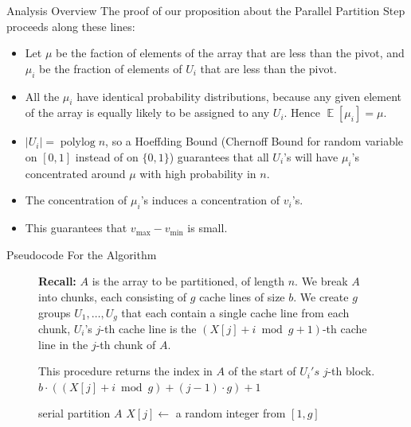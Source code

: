 \documentclass[table,serif,mathserif,final]{beamer}
\def\E{\operatorname{\mathbb{E}}}
\newcommand{\polylog}{\operatorname{polylog}}
\theoremstyle{remark}
\begin{document}
\begin{frame}{}
\begin{columns}[t]
\begin{column}{0.21\linewidth}
\begin{block}{\Huge Analysis Overview}
  \justifying
  \Huge
  The proof of our proposition about the Parallel Partition Step proceeds along these lines:
  \begin{itemize}
    \item Let $\mu$ be the faction of elements of the array that are less than the pivot, and $\mu_i$ be the fraction of elements of $U_i$ that are less than the pivot.
    \item All the $\mu_i$ have identical probability distributions, because any given element of the array is equally likely to be assigned to any $U_i$. Hence $\E[\mu_i] = \mu$.
    \item $|U_i| = \polylog n$, so a Hoeffding Bound (Chernoff Bound for random variable on $[0,1]$ instead of on $\{0,1\}$) guarantees that all $U_i$'s
      will have $\mu_i$'s concentrated around $\mu$ with high probability in $n$.
    \item The concentration of $\mu_i$'s induces a concentration of $v_i$'s. 
    \item This guarantees that $v_{\max} - v_{\min}$ is small. 
  \end{itemize}
\end{block}
\vspace{1cm}

\begin{block}{\Huge Pseudocode For the Algorithm}
  \justifying
  \large

\begin{figure}
  \label{alg:parallelPartition_smoothedStriding}
  \begin{algorithmic}%
    \State \textbf{Recall:} 
    \State $A$ is the array to be partitioned, of length $n$. 
    \State We break $A$ into chunks, each consisting of $g$ cache lines of size $b$.
    \State We create $g$ groups $U_1,\ldots, U_g$ that each contain a single cache line from each chunk,
    \State $U_i$'s $j$-th cache line is the $(X[j]+i \bmod g + 1)$-th cache line in the $j$-th chunk of $A$.
    \State

      \Comment This procedure returns the index in $A$ of the start of $U_i's$ $j$-th block.
      \State\Return $b\cdot ((X[j] + i \bmod g) +(j-1)\cdot g)+1$
    \EndProcedure
    \State

        \State serial partition $A$
      \Else
          \State $X[j] \gets$ a random integer from $[1,g]$ 
        \EndFor


\end{algorithmic}
\end{figure}
\end{block}
\end{column}
\end{columns}
\end{frame}
\end{document}
